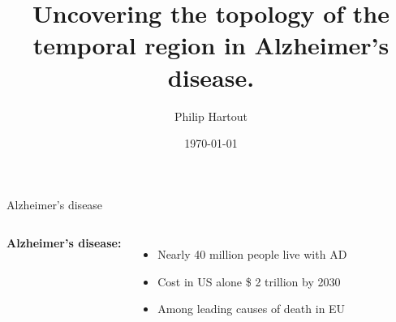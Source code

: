 \documentclass[aspectratio=169, 10pt, dvipsnames]{beamer}
\title{Uncovering the topology of the temporal region in Alzheimer's disease.}
\date{\today}
\author{Philip Hartout}
\begin{document}
\maketitle


\begin{frame}[fragile]{Alzheimer's disease}

  \begin{columns}[T,onlytextwidth]
    \textbf{Alzheimer's disease:} \brain
    \begin{itemize}
    \item Nearly 40 million people live with AD
    \item Cost in US alone \$ 2 trillion by 2030
    \item Among leading causes of death in EU
    \end{itemize}
\end{columns}
\end{frame}
\end{document}
